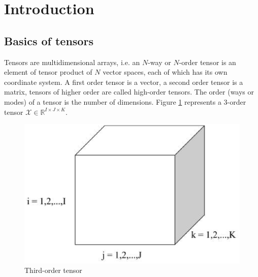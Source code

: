 \documentclass[letterpaper,12pt]{article}
\begin{document}
  



\clearpage


\clearpage

\tableofcontents

\newpage

\section{Introduction}

\subsection{Basics of tensors}

Tensors are multidimensional arrays, i.e. an $N$-way or $N$-order tensor is an element of tensor product of $N$ vector spaces, each of which has its own coordinate system. A first order tensor is a vector, a second order tensor is a matrix, tensors of higher order are called high-order tensors. The order (ways or modes) of a tensor is the number of dimensions. Figure \ref{fig:3tensor} represents a 3-order tensor $\mathcal{X}\in\mathbb{R}^{I\times J\times K}$.

\begin{figure}[!ht]
\centering
 \includegraphics[scale=0.4]{Images/3rd-order_tensor.eps}
 \caption{Third-order tensor}\label{fig:3tensor}
\end{figure}
\end{document}
